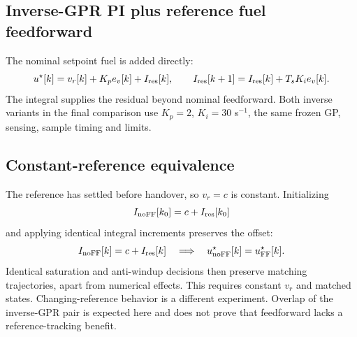 \documentclass[11pt,a4paper]{article}
\begin{document}
\subsection{Inverse-GPR PI plus reference fuel feedforward}
The nominal setpoint fuel is added directly:
\begin{equation}
u^\star[k]=v_r[k]+K_pe_v[k]+I_{\rm res}[k],\qquad
I_{\rm res}[k+1]=I_{\rm res}[k]+T_sK_ie_v[k].
\label{eq:invff}
\end{equation}
The integral supplies the residual beyond nominal feedforward. Both inverse variants in the final comparison use $K_p=2$, $K_i=30$ s$^{-1}$, the same frozen GP, sensing, sample timing and limits.

\subsection{Constant-reference equivalence}
The reference has settled before handover, so $v_r=c$ is constant. Initializing
\begin{equation}I_{\rm noFF}[k_0]=c+I_{\rm res}[k_0]\end{equation}
and applying identical integral increments preserves the offset:
\begin{equation}
I_{\rm noFF}[k]=c+I_{\rm res}[k]\quad\Longrightarrow\quad
u^\star_{\rm noFF}[k]=u^\star_{\rm FF}[k].
\label{eq:equivalence}
\end{equation}
Identical saturation and anti-windup decisions then preserve matching trajectories, apart from numerical effects. This requires constant $v_r$ and matched states. Changing-reference behavior is a different experiment. Overlap of the inverse-GPR pair is expected here and does not prove that feedforward lacks a reference-tracking benefit.
\end{document}
